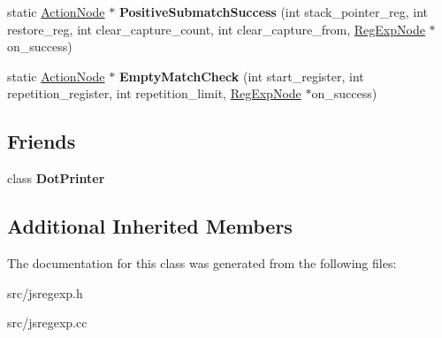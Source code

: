 \begin{DoxyCompactItemize}
\item 
\hypertarget{classv8_1_1internal_1_1_action_node_a89bed32eadb39ad776f7e5523d8d152b}{}static \hyperlink{classv8_1_1internal_1_1_action_node}{Action\+Node} $\ast$ {\bfseries Positive\+Submatch\+Success} (int stack\+\_\+pointer\+\_\+reg, int restore\+\_\+reg, int clear\+\_\+capture\+\_\+count, int clear\+\_\+capture\+\_\+from, \hyperlink{classv8_1_1internal_1_1_reg_exp_node}{Reg\+Exp\+Node} $\ast$on\+\_\+success)\label{classv8_1_1internal_1_1_action_node_a89bed32eadb39ad776f7e5523d8d152b}

\item 
\hypertarget{classv8_1_1internal_1_1_action_node_a1f8492811dde72cce77b5b7f8d083292}{}static \hyperlink{classv8_1_1internal_1_1_action_node}{Action\+Node} $\ast$ {\bfseries Empty\+Match\+Check} (int start\+\_\+register, int repetition\+\_\+register, int repetition\+\_\+limit, \hyperlink{classv8_1_1internal_1_1_reg_exp_node}{Reg\+Exp\+Node} $\ast$on\+\_\+success)\label{classv8_1_1internal_1_1_action_node_a1f8492811dde72cce77b5b7f8d083292}

\end{DoxyCompactItemize}
\subsection*{Friends}
\begin{DoxyCompactItemize}
\item 
\hypertarget{classv8_1_1internal_1_1_action_node_a9c19d4d6fc300c029ba554cbe4d3d2e0}{}class {\bfseries Dot\+Printer}\label{classv8_1_1internal_1_1_action_node_a9c19d4d6fc300c029ba554cbe4d3d2e0}

\end{DoxyCompactItemize}
\subsection*{Additional Inherited Members}


The documentation for this class was generated from the following files\+:\begin{DoxyCompactItemize}
\item 
src/jsregexp.\+h\item 
src/jsregexp.\+cc\end{DoxyCompactItemize}
